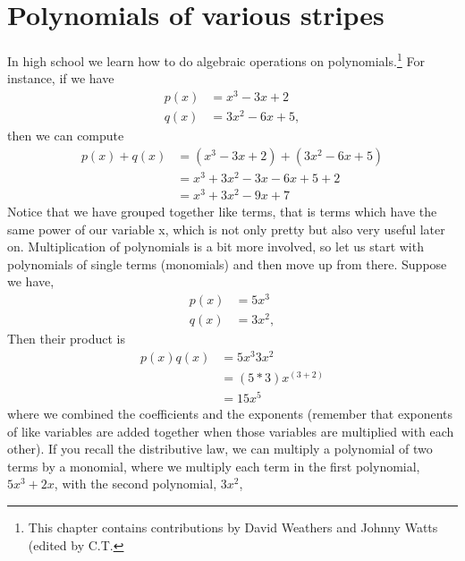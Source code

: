 

 
\section{Polynomials of various stripes}
In high school we learn how to do algebraic operations on polynomials.\footnote{This chapter contains contributions by David Weathers and Johnny Watts (edited by C.T.} For instance, if we have
\begin{align*} 
p(x) & = x^3 -3x +2 \\
q(x) & = 3x^2 -6x +5,
\end{align*}
then we can compute 
\begin{align*}
p(x) + q(x) 
& =  ( x^3 - 3 x + 2 ) + ( 3 x^2 - 6 x + 5 ) \\
& = x^3 + 3x^2 - 3x - 6x + 5 + 2\\
& = x^3 + 3 x^2 - 9 x + 7
\end{align*}
Notice that we have grouped together like terms, that is terms which have the same power of our variable x, which is not only pretty but also very useful later on.  Multiplication of polynomials is a bit more involved, so let us start with polynomials of single terms (monomials) and then move up from there.  Suppose we have,
\begin{align*} 
p(x) & = 5x^3 \\
q(x) & = 3x^2,
\end{align*}
Then their product is
\begin{align*}
p(x)  q(x) 
& =  5x^3 3 x^2 \\
& = (5*3)x^{(3 + 2)}\\
& = 15x^5
\end{align*}
where we combined the coefficients and the exponents (remember that exponents of like variables are added together when those variables are multiplied with each other).  If you recall the distributive law, we can multiply a polynomial of two terms by a monomial, where we multiply each term in the first polynomial,$ 5x^3 + 2x$, with the second polynomial, $3x^2$,
